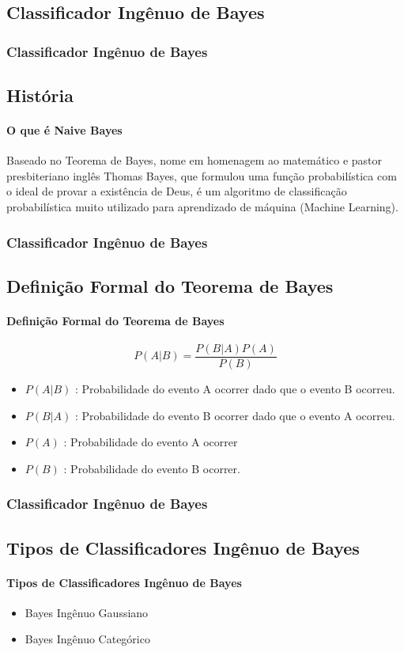 \documentclass{beamer}
\begin{document}
\begin{frame}
    \section{Classificador Ingênuo de Bayes}
    \frametitle{Classificador Ingênuo de Bayes}
    \subsection{História}
    \framesubtitle{O que é Naive Bayes}
    
    Baseado no Teorema de Bayes, nome em homenagem ao matemático e pastor presbiteriano inglês Thomas Bayes, que formulou uma função probabilística com o ideal de provar a existência de Deus, é um algoritmo de classificação probabilística muito utilizado para aprendizado de máquina (Machine Learning).
    
\end{frame}

\begin{frame}
\frametitle{Classificador Ingênuo de Bayes}
\subsection{Definição Formal do Teorema de Bayes}
\framesubtitle{Definição Formal do Teorema de Bayes}
\begin{equation}
    P(A|B) = \frac{P(B|A)P(A)}{P(B)}
\end{equation}

\begin{itemize}
\item $P(A|B)$ : Probabilidade do evento A ocorrer dado que o evento B ocorreu.
\item $P(B|A)$ : Probabilidade do evento B ocorrer dado que o evento A ocorreu.
\item $P(A)$   : Probabilidade do evento A ocorrer
\item $P(B)$   : Probabilidade do evento B ocorrer. 
\end{itemize}

\end{frame}

\begin{frame}
\frametitle{Classificador Ingênuo de Bayes}
\subsection{Tipos de Classificadores Ingênuo de Bayes}
\framesubtitle{Tipos de Classificadores Ingênuo de Bayes}
\begin{itemize}
\item Bayes Ingênuo Gaussiano
\item Bayes Ingênuo Categórico
\end{itemize}
\end{frame}
\end{document}
